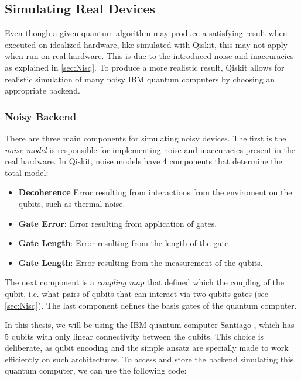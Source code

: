 \subsection{Simulating Real Devices}\label{sec:Simulating Real Devices}

Even though a given quantum algorithm may produce a satisfying result when executed on idealized hardware, like simulated with Qiskit, this may not apply when run on real hardware. This is due to the introduced noise and inaccuracies as explained in \autoref{sec:Nisq}. To produce a more realistic result, Qiskit allows for realistic simulation of many noisy IBM quantum computers by choosing an appropriate backend. 

\subsubsection*{Noisy Backend}

There are three main components for simulating noisy devices. The first is the \emph{noise model} is responsible for implementing noise and inaccuracies present in the real hardware. In Qiskit, noise models have 4 components that determine the total model:

\begin{itemize}
    \item \textbf{Decoherence} Error resulting from interactions from the enviroment on the qubits, such as thermal noise.
    \item \textbf{Gate Error}: Error resulting from application of gates.
    \item \textbf{Gate Length}: Error resulting from the length of the gate.
    \item \textbf{Gate Length}: Error resulting from the measurement of the qubits. 
\end{itemize}

The next component is a \emph{coupling map} that defined which the coupling of the qubit, i.e. what pairs of qubits that can interact via two-qubits gates (see \autoref{sec:Nisq}). The last component defines the basis gates of the quantum computer. 

In this thesis, we will be using the IBM quantum computer Santiago \cite{santiago}, which has 5 qubits with only linear connectivity between the qubits. This choice is deliberate, as qubit encoding and the simple ansatz are specially made to work efficiently on such architectures. To access and store the backend simulating this quantum computer, we can use the following code:

